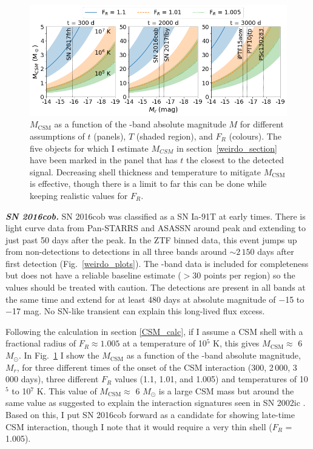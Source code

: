 \documentclass[a4paper,oneside,12pt, class=Latex/Classes/PhDthesisPSnPDF, crop=false]{standalone}
\begin{document}
\begin{figure}
    \centering
    \includegraphics[width=16cm]{../Images/chapter_4/M_MCSM_rel.png}
    \caption{$M_\text{CSM}$ as a function of the \ztfr-band absolute magnitude $M$ for different assumptions of $t$ (panels), $T$ (shaded region), and $F_R$ (colours). The five objects for which I estimate $M_{CSM}$ in section~\ref{weirdo_section} have been marked in the panel that has $t$ the closest to the detected signal. Decreasing shell thickness and temperature to mitigate $M_\text{CSM}$ is effective, though there is a limit to far this can be done while keeping realistic values for $F_R$.}
    \label{M_CMS_fig}
\end{figure}


\textit{\textbf{SN 2016cob.}}
SN 2016cob was classified as a SN Ia-91T at early times. There is light curve data from Pan-STARRS and ASASSN around peak and extending to just past 50 days after the peak. In the ZTF binned data, this event jumps up from non-detections to detections in all three bands around $\sim2\,150$ days after first detection (Fig.~\ref{weirdo_plots}). The \ztfi-band data is included for completeness but does not have a reliable baseline estimate ($>$30 points per region) so the values should be treated with caution. The detections are present in all bands at the same time and extend for at least 480 days at absolute magnitude of $-$15 to $-$17 mag. No SN-like transient can explain this long-lived flux excess.

Following the calculation in section \ref{CSM_calc}, if I assume a CSM shell with a fractional radius of $F_R\approx 1.005$ at a temperature of 10$^5$ K, this gives $M_\text{CSM}\approx$ 6 $M_\odot$. In Fig.~\ref{M_CMS_fig} I show the $M_\text{CSM}$ as a function of the \ztfr-band absolute magnitude, $M_r$, for three different times of the onset of the CSM interaction (300, 2\,000, 3\,000 days), three different $F_R$ values (1.1, 1.01, and 1.005) and temperatures of 10$^5$ to 10$^7$ K. This value of $M_\text{CSM}\approx$ 6 $M_\odot$ is a large CSM mass but around the same value as suggested to explain the interaction signatures seen in SN 2002ic \citep{Hamuy_02ic}. Based on this, I put SN 2016cob forward as a candidate for showing late-time CSM interaction, though I note that it would require a very thin shell ($F_R$ = 1.005).
\end{document}
